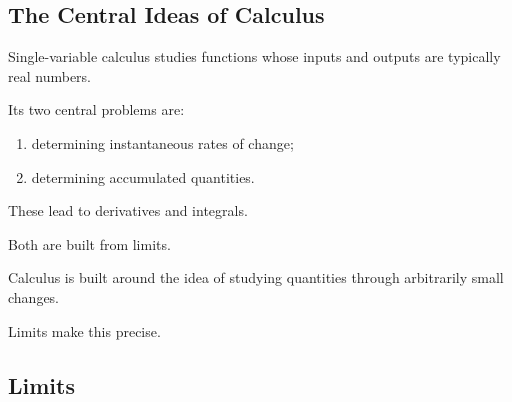 \subsection{The Central Ideas of Calculus}
\label{subsec:central-ideas-calculus}

Single-variable calculus studies functions whose inputs and outputs are
typically real numbers.

Its two central problems are:

\begin{enumerate}
    \item determining instantaneous rates of change;
    \item determining accumulated quantities.
\end{enumerate}

These lead to derivatives and integrals.

Both are built from limits.

\begin{center}
\end{center}

\begin{conceptbox}
Calculus is built around the idea of studying quantities through arbitrarily
small changes.

Limits make this precise.
\end{conceptbox}

\subsection{Limits}
\label{subsec:limits-introduction}

